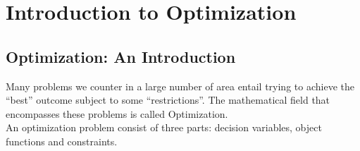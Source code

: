 \chapter{Introduction to Optimization}

\section{Optimization: An Introduction}

Many problems we counter in a large number of area entail trying to achieve the ``best'' outcome subject to some ``restrictions''. The mathematical field that encompasses these problems is called Optimization. \\

An optimization problem consist of three parts: decision variables, object functions and constraints.

